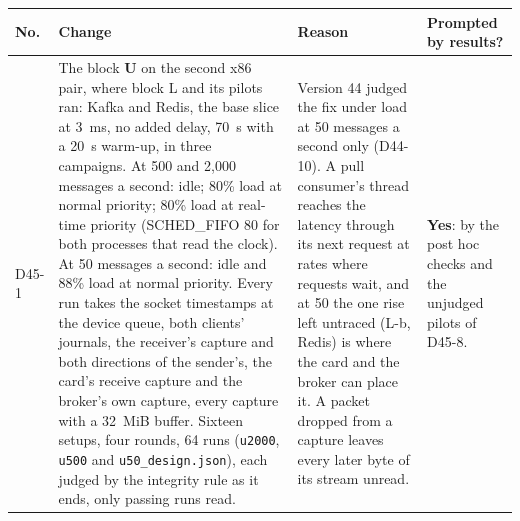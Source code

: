 \documentclass[11pt]{article}
\begin{document}
{\small
\begin{longtable}{@{}p{1.1cm} >{\raggedright\arraybackslash}p{6.1cm} >{\raggedright\arraybackslash}p{6.0cm} >{\raggedright\arraybackslash}p{2.2cm}@{}}
\toprule
\textbf{No.} & \textbf{Change} & \textbf{Reason} & \textbf{Prompted by results?} \\
\midrule
\endhead
D45-1 & The block \textbf{U} on the second x86 pair, where block L and its pilots ran: Kafka and Redis, the base slice at 3~ms, no added delay, 70~s with a 20~s warm-up, in three campaigns. At 500 and 2,000 messages a second: idle; 80\% load at normal priority; 80\% load at real-time priority (SCHED\_FIFO 80 for both processes that read the clock). At 50 messages a second: idle and 88\% load at normal priority. Every run takes the socket timestamps at the device queue, both clients' journals, the receiver's capture and both directions of the sender's, the card's receive capture and the broker's own capture, every capture with a 32~MiB buffer. Sixteen setups, four rounds, 64 runs (\texttt{u2000}, \texttt{u500} and \texttt{u50\_design.json}), each judged by the integrity rule as it ends, only passing runs read. & Version 44 judged the fix under load at 50 messages a second only (D44-10). A pull consumer's thread reaches the latency through its next request at rates where requests wait, and at 50 the one rise left untraced (L-b, Redis) is where the card and the broker can place it. A packet dropped from a capture leaves every later byte of its stream unread. & \textbf{Yes}: by the post hoc checks and the unjudged pilots of D45-8. \\

\end{longtable}}
\end{document}
